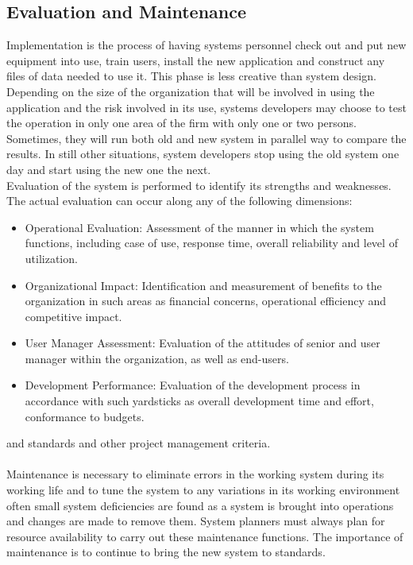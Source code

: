 \subsection{Evaluation and Maintenance}
Implementation is the process of having systems personnel check out and put new equipment into use, train users, install the new application and construct any files of data
needed to use it. This phase is less creative than system design. Depending on the size of the organization that will be involved in using the application and the risk involved
in its use, systems developers may choose to test the operation in only one area of the firm with only one or two persons. Sometimes, they will run both old and new system
in parallel way to compare the results. In still other situations, system developers stop using the old system one day and start using the new one the next.\\
Evaluation of the system is performed to identify its strengths and weaknesses. The actual evaluation can occur along any of the following dimensions:\\
\begin{itemize}
\item Operational Evaluation: Assessment of the manner in which the system functions, including case of use, response time, overall reliability and level of utilization.
\item Organizational Impact: Identification and measurement of benefits to the organization in such areas as financial concerns, operational efficiency and competitive impact.
\item User Manager Assessment: Evaluation of the attitudes of senior and user manager within the organization, as well as end-users.
\item Development Performance: Evaluation of the development process in accordance with such yardsticks as overall development time and effort, conformance to budgets.
\end{itemize}
and standards and other project management criteria.\\\\
Maintenance is necessary to eliminate errors in the working system during its working life and to tune the system to any variations in its working environment often small system deficiencies are found as a system is brought into operations and changes are made to remove them. System planners must always plan for resource availability to carry out these maintenance functions. The importance of maintenance is to continue to bring the new system to standards.\\
\newpage
